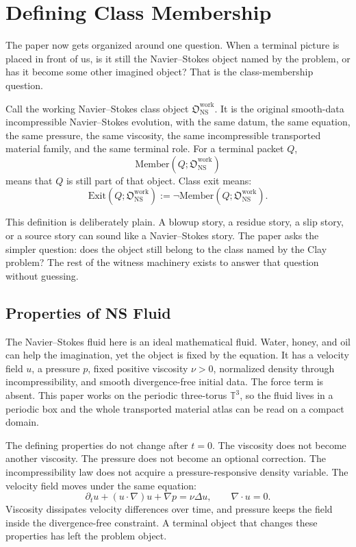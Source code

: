 \documentclass[11pt]{article}
\newcommand{\NS}{\mathrm{NS}}
\newcommand{\Member}{\mathrm{Member}}
\newcommand{\Exit}{\mathrm{Exit}}
\newcommand{\Owork}{\mathfrak O_{\NS}^{\mathrm{work}}}
\begin{document}
\section{Defining Class Membership}

The paper now gets organized around one question.
When a terminal picture is placed in front of us, is it still the Navier--Stokes object named by the problem, or has it become some other imagined object?
That is the class-membership question.

Call the working Navier--Stokes class object \(\Owork\).
It is the original smooth-data incompressible Navier--Stokes evolution, with the same datum, the same equation, the same pressure, the same viscosity, the same incompressible transported material family, and the same terminal role.
For a terminal packet \(Q\),
\[
  \Member(Q;\Owork)
\]
means that \(Q\) is still part of that object.
Class exit means:
\[
  \Exit(Q;\Owork):=\neg\Member(Q;\Owork).
\]

This definition is deliberately plain.
A blowup story, a residue story, a slip story, or a source story can sound like a Navier--Stokes story.
The paper asks the simpler question: does the object still belong to the class named by the Clay problem?
The rest of the witness machinery exists to answer that question without guessing.

\subsection{Properties of NS Fluid}

The Navier--Stokes fluid here is an ideal mathematical fluid.
Water, honey, and oil can help the imagination, yet the object is fixed by the equation.
It has a velocity field \(u\), a pressure \(p\), fixed positive viscosity \(\nu>0\), normalized density through incompressibility, and smooth divergence-free initial data.
The force term is absent.
This paper works on the periodic three-torus \(\mathbb T^3\), so the fluid lives in a periodic box and the whole transported material atlas can be read on a compact domain.

The defining properties do not change after \(t=0\).
The viscosity does not become another viscosity.
The pressure does not become an optional correction.
The incompressibility law does not acquire a pressure-responsive density variable.
The velocity field moves under the same equation:
\[
  \partial_tu+(u\cdot\nabla)u+\nabla p=\nu\Delta u,
  \qquad
  \nabla\cdot u=0.
\]
Viscosity dissipates velocity differences over time, and pressure keeps the field inside the divergence-free constraint.
A terminal object that changes these properties has left the problem object.
\end{document}
